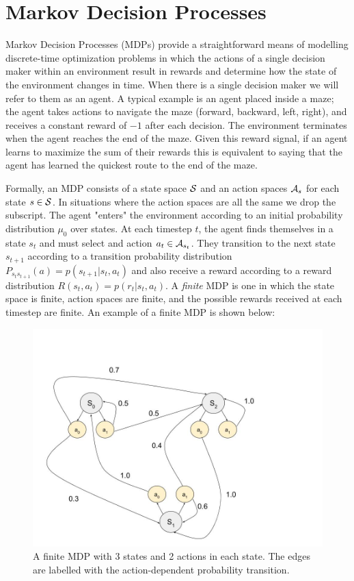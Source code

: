 \section{Markov Decision Processes}
\label{sec:MDP}

Markov Decision Processes (MDPs) provide a straightforward means of modelling discrete-time optimization problems in which the actions of a single decision maker within an environment result in rewards and determine how the state of the environment changes in time. When there is a single decision maker we will refer to them as an agent. A typical example is an agent placed inside a maze; the agent takes actions to navigate the maze (forward, backward, left, right), and receives a constant reward of $-1$ after each decision. The environment terminates when the agent reaches the end of the maze. Given this reward signal, if an agent learns to maximize the sum of their rewards this is equivalent to saying that the agent has learned the quickest route to the end of the maze.

Formally, an MDP consists of a state space $\SS$ and an action spaces $\AA_s$ for each state $s \in \SS$. In situations where the action spaces are all the same we drop the subscript. The agent "enters" the environment according to an initial probability distribution $\mu_0$ over states. At each timestep $t$, the agent finds themselves in a state $s_t$ and must select and action $a_t \in \AA_{s_t}$. They transition to the next state $s_{t+1}$ according to a transition probability distribution $P_{s_ts_{t+1}}(a) = p(s_{t+1} | s_t, a_t)$ and also receive a reward according to a reward distribution $R(s_t, a_t) = p(r_t | s_t, a_t)$. A {\em finite} MDP is one in which the state space is finite, action spaces are finite, and the possible rewards received at each timestep are finite. An example of a finite MDP is shown below:

\begin{figure}
    \centering
    \includegraphics[scale=0.4]{images/simple_mdp.jpg}
    \caption{A finite MDP with 3 states and 2 actions in each state. The edges are labelled with the action-dependent probability transition.}
    \label{fig:simplemdp}
\end{figure}


